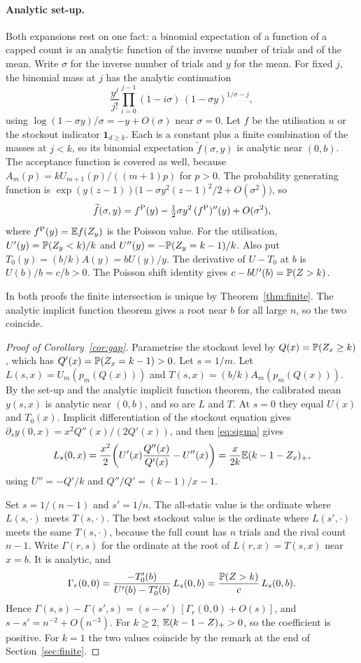 \paragraph{Analytic set-up.}
Both expansions rest on one fact: a binomial expectation of a function of a capped count is an analytic function of the inverse number of trials and of the mean. Write $\sigma$ for the inverse number of trials and $y$ for the mean. For fixed $j$, the binomial mass at $j$ has the analytic continuation
\[
 \frac{y^j}{j!}\prod_{i=0}^{j-1}(1-i\sigma)\,(1-\sigma y)^{1/\sigma-j},
\]
using $\log(1-\sigma y)/\sigma=-y+O(\sigma)$ near $\sigma=0$. Let $f$ be the utilisation $u$ or the stockout indicator $\mathbf 1_{d\ge k}$. Each is a constant plus a finite combination of the masses at $j<k$, so its binomial expectation $\widetilde f(\sigma,y)$ is analytic near $(0,b)$. The acceptance function is covered as well, because $A_m(p)=kU_{m+1}(p)/((m+1)p)$ for $p>0$. The probability generating function is $\exp(y(z-1))\big(1-\sigma y^2(z-1)^2/2+O(\sigma^2)\big)$, so
\begin{equation}\label{eq:sigma}
 \widetilde f(\sigma,y)=f^{\rm P}(y)-\tfrac12\sigma y^2\,(f^{\rm P})''(y)+O(\sigma^2),
\end{equation}
where $f^{\rm P}(y)=\mathbb E f(Z_y)$ is the Poisson value. For the utilisation, $U'(y)=\mathbb P(Z_y<k)/k$ and $U''(y)=-\mathbb P(Z_y=k-1)/k$. Also put $T_0(y)=(b/k)A(y)=bU(y)/y$. The derivative of $U-T_0$ at $b$ is $U(b)/b=c/b>0$. The Poisson shift identity gives $c-bU'(b)=\mathbb P(Z>k)$.

In both proofs the finite intersection is unique by Theorem~\ref{thm:finite}. The analytic implicit function theorem gives a root near $b$ for all large $n$, so the two coincide.

\begin{proof}[Proof of Corollary~\ref{cor:gap}]
Parametrise the stockout level by $Q(x)=\mathbb P(Z_x\ge k)$, which has $Q'(x)=\mathbb P(Z_x=k-1)>0$. Let $s=1/m$. Let $L(s,x)=U_m(p_m(Q(x)))$ and $T(s,x)=(b/k)A_m(p_m(Q(x)))$. By the set-up and the analytic implicit function theorem, the calibrated mean $y(s,x)$ is analytic near $(0,b)$, and so are $L$ and $T$. At $s=0$ they equal $U(x)$ and $T_0(x)$. Implicit differentiation of the stockout equation gives $\partial_sy(0,x)=x^2Q''(x)/(2Q'(x))$, and then \eqref{eq:sigma} gives
\[
 L_s(0,x)=\frac{x^2}{2}\!\left(U'(x)\frac{Q''(x)}{Q'(x)}-U''(x)\right)
         =\frac{x}{2k}\mathbb E(k-1-Z_x)_+ ,
\]
using $U''=-Q'/k$ and $Q''/Q'=(k-1)/x-1$.

Set $s=1/(n-1)$ and $s'=1/n$. The all-static value is the ordinate where $L(s,\cdot)$ meets $T(s,\cdot)$. The best stockout value is the ordinate where $L(s',\cdot)$ meets the same $T(s,\cdot)$, because the full count has $n$ trials and the rival count $n-1$. Write $\Gamma(r,s)$ for the ordinate at the root of $L(r,x)=T(s,x)$ near $x=b$. It is analytic, and
\[
 \Gamma_r(0,0)=\frac{-T_0'(b)}{U'(b)-T_0'(b)}\,L_s(0,b)=\frac{\mathbb P(Z>k)}{c}\,L_s(0,b).
\]
Hence $\Gamma(s,s)-\Gamma(s',s)=(s-s')\,[\Gamma_r(0,0)+O(s)]$, and $s-s'=n^{-2}+O(n^{-3})$. For $k\ge2$, $\mathbb E(k-1-Z)_+>0$, so the coefficient is positive. For $k=1$ the two values coincide by the remark at the end of Section~\ref{sec:finite}.
\end{proof}


